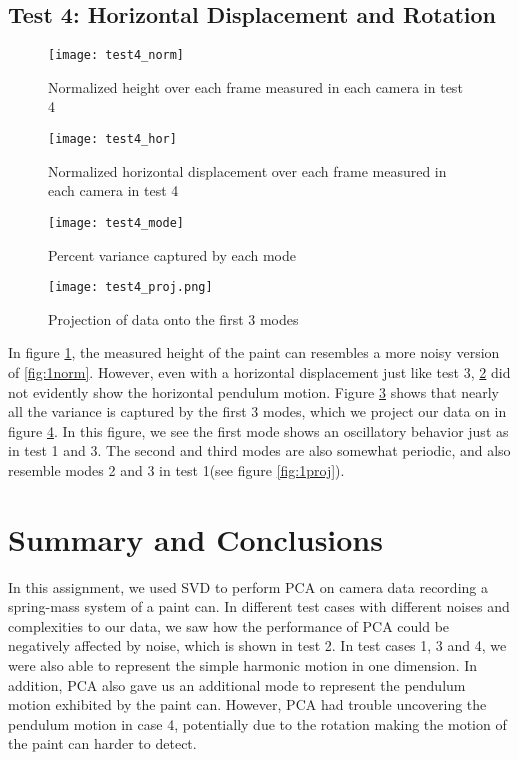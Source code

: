 \documentclass[12pt, a4paper]{article}
\begin{document}
\subsection{Test 4: Horizontal Displacement and Rotation}
\begin{figure}[H]
    \centering
    \texttt{[image: test4\_norm]}
    \caption{Normalized height over each frame measured in each camera in test 4}
    \label{fig:4norm}
\end{figure}
\begin{figure}[H]
    \centering
    \texttt{[image: test4\_hor]}
    \caption{Normalized horizontal displacement over each frame measured in each camera in test 4}
    \label{fig:4hor}
\end{figure}
\begin{figure}[H]
    \centering
    \texttt{[image: test4\_mode]}
    \caption{Percent variance captured by each mode}
    \label{fig:4mode}
\end{figure}
\begin{figure}[H]
    \centering
    \texttt{[image: test4\_proj.png]}
    \caption{Projection of data onto the first 3 modes}
    \label{fig:4proj}
\end{figure}
In figure \ref{fig:4norm}, the measured height of the paint can resembles a more noisy version of \ref{fig:1norm}. However, even with a horizontal displacement just like test 3, \ref{fig:4hor} did not evidently show the horizontal pendulum motion. Figure \ref{fig:4mode} shows that nearly all the variance is captured by the first 3 modes, which we project our data on in figure \ref{fig:4proj}. In this figure, we see the first mode shows an oscillatory behavior just as in test 1 and 3. The second and third modes are also somewhat periodic, and also resemble modes 2 and 3 in test 1(see figure \ref{fig:1proj}).

\section{Summary and Conclusions}
In this assignment, we used SVD to perform PCA on camera data recording a spring-mass system of a paint can. 
In different test cases with different noises and complexities to our data, we saw how the performance of PCA could be negatively affected by noise, which is shown in test 2. In test cases 1, 3 and 4, we were also able to represent the simple harmonic motion in one dimension. In addition, PCA also gave us an additional mode to represent the pendulum motion exhibited by the paint can. However, PCA had trouble uncovering the pendulum motion in case 4, potentially due to the rotation making the motion of the paint can harder to detect.
\end{document}
